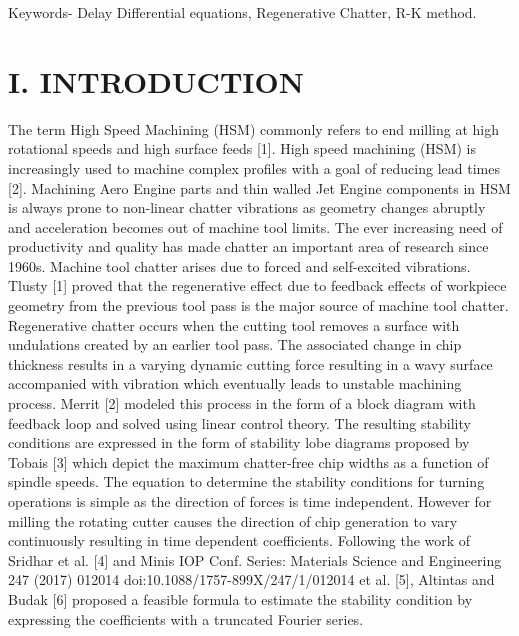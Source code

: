 \documentclass[10pt]{article}
\newcommand{\customfootnote}[1]{
  \let\thefootnote\relax\footnotetext{#1}
}
\begin{document}
Keywords- Delay Differential equations, Regenerative Chatter, R-K method.

\section*{I. INTRODUCTION}

The term High Speed Machining (HSM) commonly refers to end milling at high rotational speeds and high surface feeds [1]. High speed machining (HSM) is increasingly used to machine complex profiles with a goal of reducing lead times [2]. Machining Aero Engine parts and thin walled Jet Engine components in HSM is always prone to non-linear chatter vibrations as geometry changes abruptly and acceleration becomes out of machine tool limits. The ever increasing need of productivity and quality has made chatter an important area of research since 1960s. Machine tool chatter arises due to forced and self-excited vibrations. Tlusty [1] proved that the regenerative effect due to feedback effects of workpiece geometry from the previous tool pass is the major source of machine tool chatter. Regenerative chatter occurs when the cutting tool removes a surface with undulations created by an earlier tool pass. The associated change in chip thickness results in a varying dynamic cutting force resulting in a wavy surface accompanied with vibration which eventually leads to unstable machining process. Merrit [2] modeled this process in the form of a block diagram with feedback loop and solved using linear control theory. The resulting stability conditions are expressed in the form of stability lobe diagrams proposed by Tobais [3] which depict the maximum chatter-free chip widths as a function of spindle speeds. The equation to determine the stability conditions for turning operations is simple as the direction of forces is time independent. However for milling the rotating cutter causes the direction of chip generation to vary continuously resulting in time dependent coefficients. Following the work of Sridhar et al. [4] and Minis IOP Conf. Series: Materials Science and Engineering 247 (2017) 012014 doi:10.1088/1757-899X/247/1/012014 et al. [5], Altintas and Budak [6] proposed a feasible formula to estimate the stability condition by expressing the coefficients with a truncated Fourier series.

\customfootnote{

* Corresponding author

}
\end{document}
